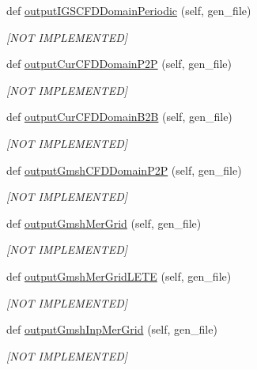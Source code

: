 \begin{DoxyCompactItemize}
def \hyperlink{a00071_a3093ea91273711f4b82aa878c0204407}{output\+I\+G\+S\+C\+F\+D\+Domain\+Periodic} (self, gen\+\_\+file)
\begin{DoxyCompactList}\small\item\em \mbox{[}N\+OT I\+M\+P\+L\+E\+M\+E\+N\+T\+ED\mbox{]} \end{DoxyCompactList}\item 
def \hyperlink{a00071_a3b5fc7f417d1912f563df69560f57c2e}{output\+Cur\+C\+F\+D\+Domain\+P2P} (self, gen\+\_\+file)
\begin{DoxyCompactList}\small\item\em \mbox{[}N\+OT I\+M\+P\+L\+E\+M\+E\+N\+T\+ED\mbox{]} \end{DoxyCompactList}\item 
def \hyperlink{a00071_a925f588daf72fce3ec4e0b89839c290d}{output\+Cur\+C\+F\+D\+Domain\+B2B} (self, gen\+\_\+file)
\begin{DoxyCompactList}\small\item\em \mbox{[}N\+OT I\+M\+P\+L\+E\+M\+E\+N\+T\+ED\mbox{]} \end{DoxyCompactList}\item 
def \hyperlink{a00071_a998cb328088bc95e267cffed35c231ce}{output\+Gmsh\+C\+F\+D\+Domain\+P2P} (self, gen\+\_\+file)
\begin{DoxyCompactList}\small\item\em \mbox{[}N\+OT I\+M\+P\+L\+E\+M\+E\+N\+T\+ED\mbox{]} \end{DoxyCompactList}\item 
def \hyperlink{a00071_a0044216044b48baae08e478a2f358c39}{output\+Gmsh\+Mer\+Grid} (self, gen\+\_\+file)
\begin{DoxyCompactList}\small\item\em \mbox{[}N\+OT I\+M\+P\+L\+E\+M\+E\+N\+T\+ED\mbox{]} \end{DoxyCompactList}\item 
def \hyperlink{a00071_a36211b3ff2243e25921e48d71b9dcf7c}{output\+Gmsh\+Mer\+Grid\+L\+E\+TE} (self, gen\+\_\+file)
\begin{DoxyCompactList}\small\item\em \mbox{[}N\+OT I\+M\+P\+L\+E\+M\+E\+N\+T\+ED\mbox{]} \end{DoxyCompactList}\item 
def \hyperlink{a00071_a258f943645c60945cbb97494db0ebf52}{output\+Gmsh\+Inp\+Mer\+Grid} (self, gen\+\_\+file)
\begin{DoxyCompactList}\small\item\em \mbox{[}N\+OT I\+M\+P\+L\+E\+M\+E\+N\+T\+ED\mbox{]} \end{DoxyCompactList}\item 

\end{DoxyCompactItemize}
